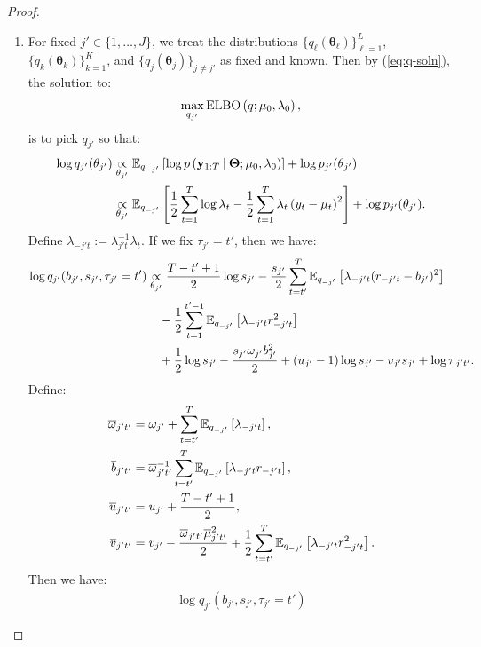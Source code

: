\begin{proof}
\begin{enumerate}[label=\roman*.]
\item For fixed $j' \in\{1,\ldots,J\}$, we treat the distributions $\{q_\ell(\boldsymbol{\theta}_\ell)\}_{\ell=1}^L$, $\{q_k(\boldsymbol{\theta}_k)\}_{k=1}^K$, and $\{q_j(\boldsymbol{\theta}_j)\}_{j\neq j'}$ as fixed and known. Then by (\ref{eq:q-soln}), the solution to:
\begin{align}
    \max_{q_{j'}} \text{\normalfont ELBO}\left(q;\mu_0,\lambda_0\right), \label{eq:elbo-j}
\end{align}
is to pick $q_{j'}$ so that:
\begin{align*}
    \log q_{j'}(\theta_{j'}) &\underset{\theta_{j'}}{\propto} \mathbb{E}_{q_{-j'}} \left[\log p\left(\mathbf{y}_{1:T} \:|\: \boldsymbol{\Theta};\mu_0,\lambda_0\right)\right]  + \log p_{j'}(\theta_{j'}) \\
    &\underset{\theta_{j'}}{\propto}  \mathbb{E}_{q_{-j'}}\left[\frac{1}{2}\sum_{t=1}^{T} \log\lambda_t - \frac{1}{2}\sum_{t=1}^{T} \lambda_{t}\left(y_t - \mu_t\right)^2\right] + \log p_{j'}(\theta_{j'}).
\end{align*}
Define $\lambda_{-j't} := \lambda_{j't}^{-1}\lambda_t$. If we fix $\tau_{j'} = t'$, then we have:
\begin{align*}
     \log q_{j'}(b_{j'}, s_{j'}, \tau_{j'} = t')&\underset{\theta_{j'}}{\propto} \frac{T - t' + 1}{2} \log s_{j'}  -\frac{s_{j'}}{2} \sum_{t=t'}^{T} \mathbb{E}_{q_{-j'}}\left[\lambda_{-j't}(r_{-j't} - b_{j'})^2\right] \\
    &\quad -\frac{1}{2} \sum_{t=1}^{t'-1} \mathbb{E}_{q_{-j'}}\left[\lambda_{-j't}r_{-j't}^2\right] \\
    &\quad + \frac{1}{2}\log s_{j'} - \frac{s_{j'}\omega_{j'}b_{j'}^2}{2} + (u_{j'}-1)\log s_{j'} - v_{j'}s_{j'} + \log \pi_{j't'}.  
\end{align*}
Define:
\begin{align*}
    \overline{\omega}_{j't'} &=  \omega_{j'} +  \sum_{t=t'}^{T} \mathbb{E}_{q_{-j'}}\left[\lambda_{-j't}\right], \\
    \overline{b}_{j't'}  &= \overline{\omega}_{j't'}^{-1}  \sum_{t=t'}^{T} \mathbb{E}_{q_{-j'}}\left[\lambda_{-j't}r_{-j't}\right], \\
    \overline{u}_{j't'} &= u_{j'} + \frac{T-t'+1}{2}, \\
    \overline{v}_{j't'} &= v_{j'} - \frac{\overline{\omega}_{j't'}\overline{\mu}^2_{j't'}}{2} + \frac{1}{2}\sum_{t=t'}^{T}\mathbb{E}_{q_{-j'}}\left[\lambda_{-j't}r^2_{-j't}\right].
\end{align*}
Then we have:
\begin{align*}
    \log q_{j'}(b_{j'}, s_{j'}, \tau_{j'} = t')

\end{align*}
\end{enumerate}
\end{proof}
